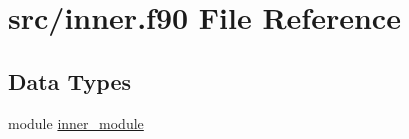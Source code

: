 \hypertarget{inner_8f90}{\section{src/inner.f90 File Reference}
\label{inner_8f90}
}
\subsection*{Data Types}
\begin{DoxyCompactItemize}
\item 
module \hyperlink{classinner__module}{inner\-\_\-module}
\end{DoxyCompactItemize}
